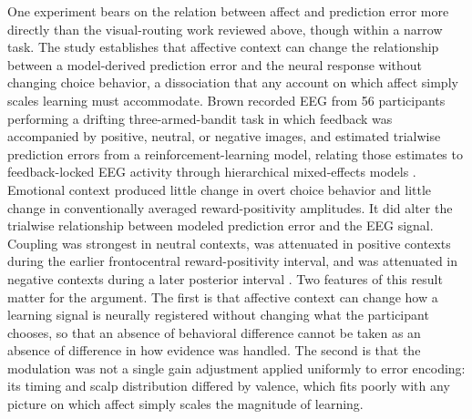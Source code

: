 \documentclass[11pt]{article}
\begin{document}
One experiment bears on the relation between affect and prediction error more directly than the visual-routing work reviewed above, though within a narrow task. The study establishes that affective context can change the relationship between a model-derived prediction error and the neural response without changing choice behavior, a dissociation that any account on which affect simply scales learning must accommodate. Brown recorded EEG from 56 participants performing a drifting three-armed-bandit task in which feedback was accompanied by positive, neutral, or negative images, and estimated trialwise prediction errors from a reinforcement-learning model, relating those estimates to feedback-locked EEG activity through hierarchical mixed-effects models \citep{Brown2026}. Emotional context produced little change in overt choice behavior and little change in conventionally averaged reward-positivity amplitudes. It did alter the trialwise relationship between modeled prediction error and the EEG signal. Coupling was strongest in neutral contexts, was attenuated in positive contexts during the earlier frontocentral reward-positivity interval, and was attenuated in negative contexts during a later posterior interval \citep{Brown2026}. Two features of this result matter for the argument. The first is that affective context can change how a learning signal is neurally registered without changing what the participant chooses, so that an absence of behavioral difference cannot be taken as an absence of difference in how evidence was handled. The second is that the modulation was not a single gain adjustment applied uniformly to error encoding: its timing and scalp distribution differed by valence, which fits poorly with any picture on which affect simply scales the magnitude of learning.
\end{document}
